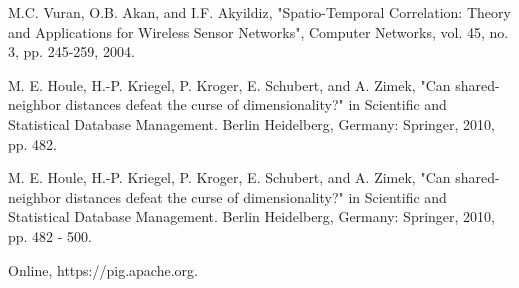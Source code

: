 \documentclass[10pt,a4paper,journal]{IEEEtran}
\begin{document}
\begin{thebibliography}{5}
M.C. Vuran,  O.B. Akan, and I.F. Akyildiz, "Spatio-Temporal Correlation:
Theory and Applications for Wireless Sensor Networks",
Computer Networks, vol. 45, no. 3, pp. 245-259, 2004.

M. E. Houle, H.-P. Kriegel, P. Kroger, E. Schubert, and A. Zimek,
"Can shared-neighbor distances defeat the curse of dimensionality?"
in Scientific and Statistical Database Management. Berlin Heidelberg,
Germany: Springer, 2010, pp. 482.

M. E. Houle, H.-P. Kriegel, P. Kroger, E. Schubert, and A. Zimek,
"Can shared-neighbor distances defeat the curse of dimensionality?"
in Scientific and Statistical Database Management. Berlin Heidelberg,
Germany: Springer, 2010, pp. 482 - 500.

Online, https://pig.apache.org.


\end{thebibliography}
\end{document}
